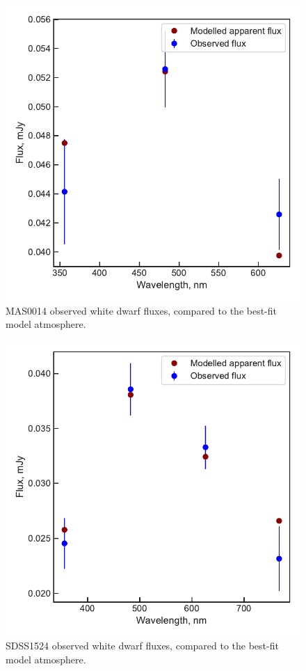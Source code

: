 \begin{figure}
    \centering
    \includegraphics[width=\textwidth]{figures/results/MASOT0014/fluxplot.pdf}
    \caption{MAS0014 observed white dwarf fluxes, compared to the best-fit model atmosphere.}
    \label{fig:MAS0014 flux plot}
\end{figure}

\begin{figure}
    \centering
    \includegraphics[width=\textwidth]{figures/results/SDSS1524/fluxplot.pdf}
    \caption{SDSS1524 observed white dwarf fluxes, compared to the best-fit model atmosphere.}
    \label{fig:SDSS1524 flux plot}
\end{figure}



